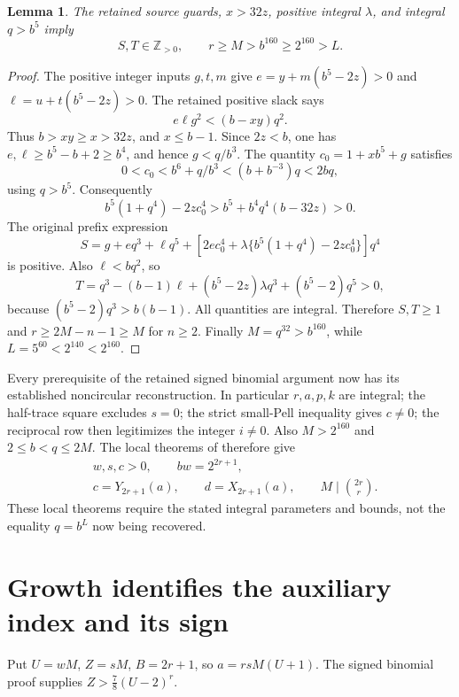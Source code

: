 \documentclass[11pt]{article}
\newtheorem{lemma}[theorem]{Lemma}
\newcommand{\Z}{\mathbb Z}\newcommand{\Q}{\mathbb Q}
\begin{document}
\begin{lemma}\label{prefix}
The retained source guards, \(x>32z\), positive integral
\(\lambda\), and integral \(q>b^5\) imply
\[
                        S,T\in\Z_{>0},\qquad
                        r\ge M>b^{160}\ge2^{160}>L.
\]
\end{lemma}
\begin{proof}
The positive integer inputs \(g,t,m\) give
\(e=y+m(b^5-2z)>0\) and
\(\ell=u+t(b^5-2z)>0\). The retained positive slack says
\[
                       e\ell g^2<(b-xy)q^2.
\]
Thus \(b>xy\ge x>32z\), and \(x\le b-1\).
Since \(2z<b\), one has \(e,\ell\ge b^5-b+2\ge b^4\),
and hence \(g<q/b^3\). The quantity \(c_0=1+xb^5+g\)
satisfies
\[
                  0<c_0<b^6+q/b^3<(b+b^{-3})q<2bq,
\]
using \(q>b^5\). Consequently
\[
 b^5(1+q^4)-2zc_0^4
       >b^5+b^4q^4(b-32z)>0.
\]
The original prefix expression
\[
 S=g+eq^3+\ell q^5+
       [2ec_0^4+\lambda\{b^5(1+q^4)-2zc_0^4\}]q^4
\]
is positive. Also \(\ell<bq^2\), so
\[
 T=q^3-(b-1)\ell+(b^5-2z)\lambda q^3+(b^5-2)q^5>0,
\]
because \((b^5-2)q^3>b(b-1)\). All quantities are integral.
Therefore \(S,T\ge1\) and
\(r\ge2M-n-1\ge M\) for \(n\ge2\).
Finally \(M=q^{32}>b^{160}\), while
\(L=5^{60}<2^{140}<2^{160}\).
\end{proof}

Every prerequisite of the retained signed binomial argument now has
its established noncircular reconstruction. In particular \(r,a,p,k\)
are integral; the half-trace square excludes \(s=0\); the strict
small-Pell inequality gives \(c\ne0\); the reciprocal row then
legitimizes the integer \(i\ne0\). Also \(M>2^{160}\) and
\(2\le b<q\le2M\). The local theorems of
\cite{Signed,CRT,Halftrace} therefore give
\begin{equation}\label{canonical}
\begin{split}
 &w,s,c>0,\qquad bw=2^{2r+1},\\
 &c=Y_{2r+1}(a),\qquad d=X_{2r+1}(a),\qquad
 M\mid\binom{2r}{r}.
\end{split}
\end{equation}
These local theorems require the stated integral parameters and
bounds, not the equality \(q=b^L\) now being recovered.

\section{Growth identifies the auxiliary index and its sign}

Put \(U=wM\), \(Z=sM\), \(B=2r+1\), so \(a=rsM(U+1)\).
The signed binomial proof supplies \(Z>\tfrac78(U-2)^r\).
\end{document}
